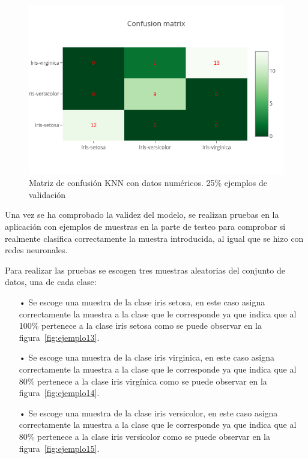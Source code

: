\documentclass[a4paper, 12pt]{book}
\begin{document}
\begin{figure}
	\centering
	\includegraphics[width=12cm, keepaspectratio]{img/cm_num_knn.png}
	\caption{Matriz de confusión KNN con datos numéricos. 25\% ejemplos de validación} 	
	\label{fig:ejemplo12}
\end{figure}

Una vez se ha comprobado la validez del modelo, se realizan pruebas en la aplicación con ejemplos de muestras en la parte de testeo para comprobar si realmente clasifica correctamente la muestra introducida, al igual que se hizo con redes neuronales.

Para realizar las pruebas se escogen tres muestras aleatorias del conjunto de datos, una de cada clase:

\begin{itemize}
\item[•] Se escoge una muestra de la clase iris setosa, en este caso asigna correctamente la muestra a la clase que le corresponde ya que indica que al 100\% pertenece a la clase iris setosa como se puede observar en la figura~\ref{fig:ejemplo13}.
\item[•] Se escoge una muestra de la clase iris virginica, en este caso asigna correctamente la muestra a la clase que le corresponde ya que indica que al 80\% pertenece a la clase iris virgínica como se puede observar en la figura~\ref{fig:ejemplo14}.
\item[•] Se escoge una muestra de la clase iris versicolor, en este caso asigna correctamente la muestra a la clase que le corresponde ya que indica que al 80\% pertenece a la clase iris versicolor como se puede observar en la figura~\ref{fig:ejemplo15}.
\end{itemize}
\end{document}
